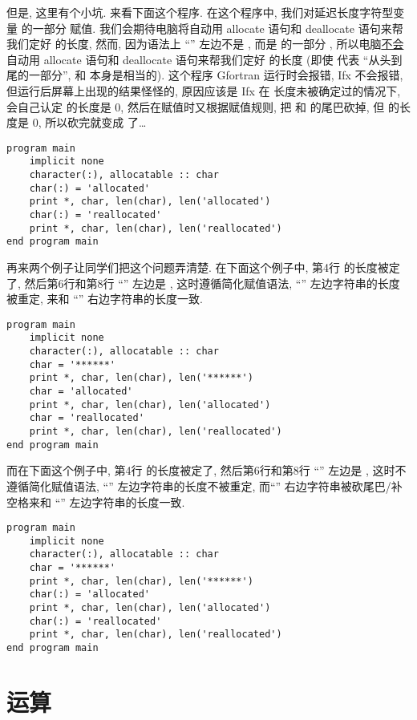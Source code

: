 但是, 这里有个小坑. 来看下面这个程序. 在这个程序中, 我们对延迟长度字符型变量  的一部分  赋值. 我们会期待电脑将自动用 allocate 语句和 deallocate 语句来帮我们定好  的长度, 然而, 因为语法上 ``\ttt{=}'' 左边不是 , 而是  的一部分 , 所以电脑\uline{不会}自动用 allocate 语句和 deallocate 语句来帮我们定好  的长度 (即使  代表  ``从头到尾的一部分'', 和  本身是相当的). 这个程序 Gfortran 运行时会报错, Ifx 不会报错, 但运行后屏幕上出现的结果怪怪的, 原因应该是 Ifx 在  长度未被确定过的情况下, 会自己认定  的长度是 $0$, 然后在赋值时又根据赋值规则, 把  和  的尾巴砍掉, 但  的长度是 $0$, 所以砍完就变成  了\dots{}
\begin{lstlisting}
program main
    implicit none
    character(:), allocatable :: char
    char(:) = 'allocated'
    print *, char, len(char), len('allocated')
    char(:) = 'reallocated'
    print *, char, len(char), len('reallocated')
end program main
\end{lstlisting}
再来两个例子让同学们把这个问题弄清楚. 在下面这个例子中, 第4行  的长度被定了, 然后第6行和第8行 ``\ttt{=}'' 左边是 , 这时遵循简化赋值语法, ``\ttt{=}'' 左边字符串的长度被重定, 来和 ``\ttt{=}'' 右边字符串的长度一致.
\begin{lstlisting}
program main
    implicit none
    character(:), allocatable :: char
    char = '******'
    print *, char, len(char), len('******')
    char = 'allocated'
    print *, char, len(char), len('allocated')
    char = 'reallocated'
    print *, char, len(char), len('reallocated')
end program main
\end{lstlisting}
而在下面这个例子中, 第4行  的长度被定了, 然后第6行和第8行 ``\ttt{=}'' 左边是 , 这时不遵循简化赋值语法, ``\ttt{=}'' 左边字符串的长度不被重定, 而``\ttt{=}'' 右边字符串被砍尾巴/补空格来和 ``\ttt{=}'' 左边字符串的长度一致.
\begin{lstlisting}
program main
    implicit none
    character(:), allocatable :: char
    char = '******'
    print *, char, len(char), len('******')
    char(:) = 'allocated'
    print *, char, len(char), len('allocated')
    char(:) = 'reallocated'
    print *, char, len(char), len('reallocated')
end program main
\end{lstlisting}

\section{运算}\label{fortran_opration}

